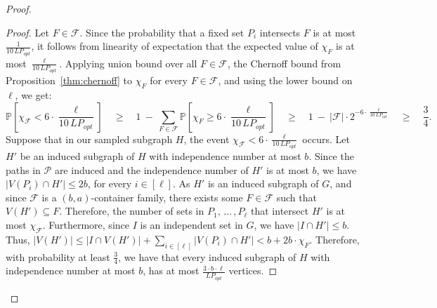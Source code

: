 \documentclass[11pt]{amsart}
\newcommand{\lpopt}{LP_{opt}}
\begin{document}
\begin{proof}
\begin{proof}
        Let $F\in\mathcal{F}$. Since the probability that a fixed set $P_i$ intersects $F$ is at most $\frac{1}{10\, \lpopt}$, it follows from linearity of expectation that the expected value of $\chi_F$ is at most $\frac{\ell}{10\, \lpopt}$. Applying union bound over all $F\in\mathcal{F}$, the Chernoff bound from Proposition~\ref{thm:chernoff} to $\chi_F$ for every $F\in\mathcal{F}$, and using the lower bound on $\ell$, we get: 
        $$
        \mathbb{P}\left[\chi_{\mathcal{F}} < 6 \cdot \frac{\ell}{10\,\lpopt}\right] \quad
        \geq \quad 1\ -\ \sum_{F\in\mathcal{F}}\mathbb{P}\left[\chi_F \geq 6 \cdot \frac{\ell}{10\,\lpopt}\right] \quad
        \geq \quad 1\ -\ |\mathcal{F}| \cdot 2^{-6 \cdot \frac{\ell}{10\,\lpopt}} \quad
        \geq \quad \frac{3}{4}.
        $$
        Suppose that in our sampled subgraph $H$, the event $\chi_{\mathcal{F}} < 6 \cdot \frac{\ell}{10\,\lpopt}$ occurs. Let $H'$ be an induced subgraph of $H$ with independence number at most $b$. Since the paths in $\mathcal{P}$ are induced and the independence number of $H'$ is at most $b$, we have $|V(P_i) \cap H'| \leq 2b$, for every $i \in [\ell]$. As $H'$ is an induced subgraph of $G$, and since $\mathcal{F}$ is a $(b,a)$-container family, there exists some $F \in \mathcal{F}$ such that $V(H')\subseteq F$. Therefore, the number of sets in $P_1,\,\dots\,, P_{\ell}$ that intersect $H'$ is at most $\chi_{\mathcal{F}}$. Furthermore, since $I$ is an independent set in $G$, we have $|I\cap H'| \leq b$. Thus, $|V(H')| \leq |I\cap V(H')| + \sum_{i\in[\ell]}|V(P_i) \cap H'| < b + 2b \cdot \chi_F$. Therefore, with probability at least $\frac{3}{4}$, we have that every induced subgraph of $H$ with independence number at most $b$, has at most $\frac{3 \cdot b \cdot \ell}{\lpopt}$ vertices.
        
        
    \end{proof}


\end{proof}
\end{document}
